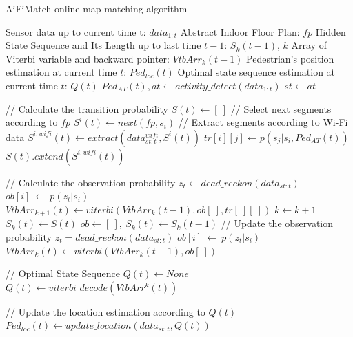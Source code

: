 \documentclass{llncs}
\begin{document}
\begin{algorithm}[H]
	\caption{AiFiMatch online map matching algorithm}
	\label{alg_aifi}
	\begin{algorithmic}[1]
		\renewcommand{\algorithmicrequire}{\textbf{Input:}}
		\renewcommand{\algorithmicensure}{\textbf{Output:}}
		\REQUIRE Sensor data up to current time t: $data_{1:t}$
		\REQUIRE Abstract Indoor Floor Plan: $fp$
		\REQUIRE Hidden State Sequence and Its Length up to last time $t-1$: $S_{k}(t-1)$, $k$
		\REQUIRE Array of Viterbi variable and backward pointer: ${VtbArr}_{k}(t-1)$
		\ENSURE Pedestrian's position estimation at current time $t$: $Ped_{loc}(t)$
		\ENSURE Optimal state sequence estimation at current time $t$: $Q(t)$
		\STATE ${Ped_{AT}(t)}, at \leftarrow activity\_detect({data_{1:t}})$
		\STATE ${st} \leftarrow {at}$  
		
		\STATE // Calculate the transition probability
		\STATE $S(t) \leftarrow [\ ]$
		\STATE // Select next segments according to $fp$
		\STATE $S^{i}(t) \leftarrow next(fp,s_i)$
		\STATE // Extract segments according to Wi-Fi data
		\STATE $S^{i,wifi}(t) \leftarrow extract(data_{st:t}^{wifi},S^{i}(t))$
		\STATE $tr[i][j] \leftarrow p(s_j|s_i,{Ped_{AT}(t)})$
		\ENDFOR
		\STATE $S(t).extend(S^{i,wifi}(t))$
		\ENDFOR
		
		\STATE // Calculate the observation probability		    
		\STATE ${z_t} \leftarrow dead\_reckon(data_{st:t})$
		\STATE $ob[i]\ \leftarrow\ p(z_t|s_i)$
		\ENDFOR
		\STATE ${VtbArr}_{k+1}(t) \leftarrow viterbi({VtbArr}_{k}(t-1), ob[\ ], tr[\ ][\ ])$
		\STATE $k \leftarrow k+1$
		\STATE $S_{k}(t) \leftarrow S(t)$
		\ELSE
		\STATE $ob \leftarrow [\ ],\ S_{k}(t) \leftarrow S_{k}(t-1)$
		\STATE // Update the observation probability
		\STATE ${z_t}=dead\_reckon(data_{st:t})$
		\STATE $ob[i]\ \leftarrow\ p(z_t|s_i)$
		\ENDFOR
		\STATE ${VtbArr}_{k}(t) \leftarrow viterbi({VtbArr}_{k}(t-1), ob[\ ])$
		\ENDIF	
		
		\STATE // Optimal State Sequence
		\STATE ${Q(t)} \leftarrow None$
		\STATE ${Q(t)} \leftarrow viterbi\_decode(VtbArr^{k}(t))$
		\ENDIF
		
		\STATE // Update the location estimation according to $Q(t)$
		\STATE $Ped_{loc}(t) \leftarrow update\_location(data_{st:t}, Q(t))$
	\end{algorithmic}
\end{algorithm}
\end{document}
